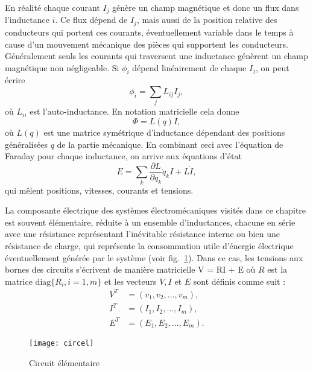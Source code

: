 En réalité chaque courant $I_j$ génère un champ magnétique et donc un flux dans l'inductance $i$. Ce flux dépend de $I_j$, mais aussi de la position relative des conducteurs qui portent ces courants, éventuellement variable dans le temps à cause d'un mouvement mécanique des pièces qui supportent les conducteurs.
Généralement seuls les courants qui traversent une inductance génèrent un champ magnétique non négligeable. Si $\phi_i$ dépend linéairement de chaque $I_j$, on peut écrire
\begin{equation}
\phi_i=\sum_j L_{ij} I_j,
\label{eq:PhiLI}
\end{equation}
où $L_{ii}$ est l'auto-inductance. En notation matricielle cela donne
\begin{equation}
\Phi=L(q) I,
\label{eq:PhiLI2}
\end{equation}
où $L(q)$ est une matrice symétrique d'inductance dépendant des positions généralisées $q$ de la partie mécanique. En combinant ceci avec l'équation de Faraday pour chaque inductance, on arrive aux équations d'état
\begin{equation}
E=\sum_k \frac{\partial L}{\partial q_k} \dot{q}_k I + L\dot{I},
\label{eq:VqI}
\end{equation}
qui mêlent positions, vitesses, courants et tensions.

La composante électrique des systèmes électromécaniques visités dans ce chapitre est souvent élémentaire, réduite à un ensemble d'inductances, chacune en série avec une résistance représentant l'inévitable résistance interne ou bien une résistance de charge, qui représente la consommation utile d'énergie électrique éventuellement générée par le système (voir fig.~\ref{fig:circel}). Dans ce cas, les tensions aux bornes des circuits s'écrivent de manière matricielle
\eqn
V = RI + E \label{ELECM}
\eeqn
où $R$ est la matrice $\mbox{diag}\{R_i, i = 1,m\}$ et les
vecteurs $V,I$ et $E$ sont définis comme suit :
\begin{equation*} \begin{split}
V^T &= (v_1, v_2, \ldots, v_m),\\
I^T &= (I_1, I_2, \ldots, I_m),\\
E^T &= (E_1, E_2, \ldots, E_m).
\end{split} \end{equation*}
\begin{figure}[t]
\begin{center}
\texttt{[image: circel]}
\caption{Circuit élémentaire}
\label{fig:circel}
\end{center}
\end{figure}



